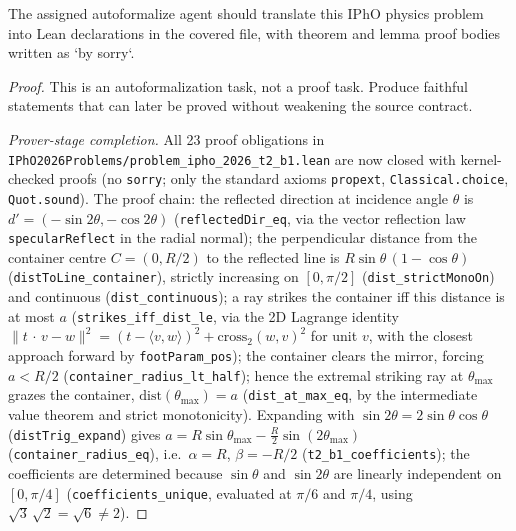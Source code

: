 \begin{theorem}
\label{thm:physics:ipho_2026_t2_b1:target}
\leanok
The assigned autoformalize agent should translate this IPhO physics problem into Lean declarations in the covered file, with theorem and lemma proof bodies written as `by sorry`.
\end{theorem}
\begin{proof}
\leanok
This is an autoformalization task, not a proof task. Produce faithful statements that can later be proved without weakening the source contract.

\emph{Prover-stage completion.} All 23 proof obligations in
\texttt{IPhO2026Problems/problem\_ipho\_2026\_t2\_b1.lean} are now closed with
kernel-checked proofs (no \texttt{sorry}; only the standard axioms
\texttt{propext}, \texttt{Classical.choice}, \texttt{Quot.sound}).  The proof
chain: the reflected direction at incidence angle $\theta$ is
$d' = (-\sin 2\theta, -\cos 2\theta)$ (\texttt{reflectedDir\_eq}, via the
vector reflection law \texttt{specularReflect} in the radial normal); the
perpendicular distance from the container centre $C = (0, R/2)$ to the
reflected line is $R\sin\theta\,(1-\cos\theta)$ (\texttt{distToLine\_container}),
strictly increasing on $[0, \pi/2]$ (\texttt{dist\_strictMonoOn}) and continuous
(\texttt{dist\_continuous}); a ray strikes the container iff this distance is at
most $a$ (\texttt{strikes\_iff\_dist\_le}, via the 2D Lagrange identity
$\lVert t\,\cdot\,v - w\rVert^2 = (t - \langle v, w\rangle)^2 + \mathrm{cross}_2(w,v)^2$
for unit $v$, with the closest approach forward by \texttt{footParam\_pos});
the container clears the mirror, forcing $a < R/2$
(\texttt{container\_radius\_lt\_half}); hence the extremal striking ray at
$\theta_{\max}$ grazes the container,
$\mathrm{dist}(\theta_{\max}) = a$ (\texttt{dist\_at\_max\_eq}, by the
intermediate value theorem and strict monotonicity).  Expanding with
$\sin 2\theta = 2\sin\theta\cos\theta$ (\texttt{distTrig\_expand}) gives
$a = R\sin\theta_{\max} - \frac{R}{2}\sin(2\theta_{\max})$
(\texttt{container\_radius\_eq}), i.e.\ $\alpha = R$, $\beta = -R/2$
(\texttt{t2\_b1\_coefficients}); the coefficients are determined because
$\sin\theta$ and $\sin 2\theta$ are linearly independent on $[0, \pi/4]$
(\texttt{coefficients\_unique}, evaluated at $\pi/6$ and $\pi/4$, using
$\sqrt{3}\,\sqrt{2} = \sqrt{6} \neq 2$).
\end{proof}
